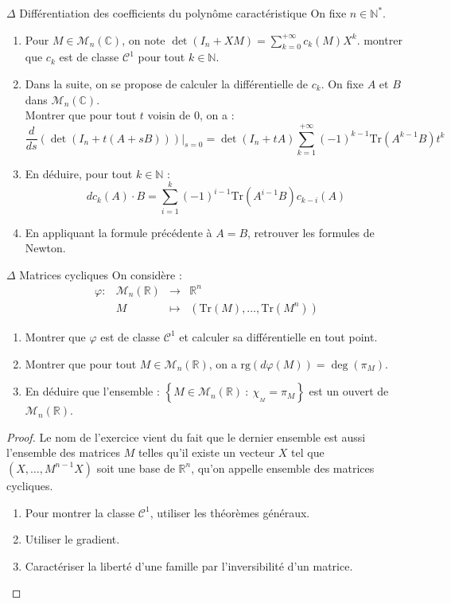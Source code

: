 \documentclass[french,a4paper]{article}
\newcommand{\N}{\mathbb{N}}
\newcommand{\R}{\mathbb{R}}
\newcommand{\C}{\mathbb{C}}
\newcommand{\st}{^*}
\newcommand{\Tr}{\text{Tr}}
\theoremstyle{plain}
\theoremstyle{definition}
\theoremstyle{remark}
\begin{document}
\begin{ex}[Moulin.CD.10]{$\Delta$ Différentiation des coefficients du polynôme caractéristique}
	On fixe $n\in\N\st$.
	\begin{enumerate}
		\item Pour $M\in\mathcal{M}_n(\C)$, on note $\det(I_n+XM)=\displaystyle\sum_{k=0}^{+\infty}c_k(M)X^k$. montrer que $c_k$ est de classe $\mathcal{C}^1$ pour tout $k\in\N$.
		\item Dans la suite, on se propose de calculer la différentielle de $c_k$. On fixe $A$ et $B$ dans $\mathcal{M}_n(\C)$. \\
		Montrer que pour tout $t$ voisin de $0$, on a : $$\frac{d}{ds}\left(\det(I_n+t(A+sB))\right)\bigg|_{s=0}=\det(I_n+tA)\sum_{k=1}^{+\infty}(-1)^{k-1}\Tr(A^{k-1}B)t^k$$
		\item En déduire, pour tout $k\in\N$ : $$dc_k(A)\cdot B=\sum_{i=1}^{k}(-1)^{i-1}\Tr(A^{i-1}B)c_{k-i}(A)$$
		\item En appliquant la formule précédente à $A=B$, retrouver les formules de Newton.
	\end{enumerate}
\end{ex}

\begin{ex}[Moulin.CD.11 / X]{$\Delta$ Matrices cycliques}
	On considère : $$\begin{array}{lrcl}
		\varphi:&\mathcal{M}_n(\R)&\longrightarrow&\R^n \\
		&M&\longmapsto&(\Tr(M),\ldots,\Tr(M^n))
	\end{array}$$
	\begin{enumerate}
		\item Montrer que $\varphi$ est de classe $\mathcal{C}^1$ et calculer sa différentielle en tout point.
		\item Montrer que pour tout $M\in\mathcal{M}_n(\R)$, on a $\text{rg}(d\varphi(M))=\deg(\pi_M)$.
		\item En déduire que l'ensemble : $\left\{M\in\mathcal{M}_n(\R)\ : \ \chi_{_M}=\pi_M\right\}$ est un ouvert de $\mathcal{M}_n(\R)$.
	\end{enumerate}
\end{ex}
\begin{proof}
	Le nom de l'exercice vient du fait que le dernier ensemble est aussi l'ensemble des matrices $M$ telles qu'il existe un vecteur $X$ tel que $(X,\ldots,M^{n-1}X)$ soit une base de $\R^n$, qu'on appelle ensemble des matrices cycliques.
	\begin{enumerate}
		\item Pour montrer la classe $\mathcal{C}^1$, utiliser les théorèmes généraux.
		\item Utiliser le gradient.
		\item Caractériser la liberté d'une famille par l'inversibilité d'un matrice.
	\end{enumerate}
\end{proof}
\end{document}
